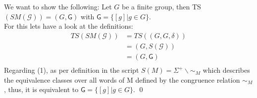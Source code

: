 \documentclass[a4paper,12pt,numbers=noenddot]{scrreport}
\begin{document}
\section{}
We want to show the following: Let $G$ be a finite group, then TS$(SM(\mathcal{G})) = (G,\mathsf{G})$ with $\mathsf{G}= \{ [g]|g\in G\}$.\\
For this lets have a look at the definitions:
\begin{align*}
    TS(SM(\mathcal{G})) &= TS((G,G,\delta)) \tag{Def. 8.10} \\
                        &= (G, S(\mathcal{G})) \tag{3.18} \\
                        &= (G, \mathsf{G}) \tag{(1), 3.10}\\ 
\end{align*}
Regarding (1), as per definition in the script $S(M) = \Sigma^+ \backslash \sim_M$ which describes the equivalence classes over all words of M defined by the congruence relation $\sim_M$, thus, it is equivalent to $\mathsf{G}= \{ [g]|g\in G\}$.
\qed
\section{}
\end{document}
